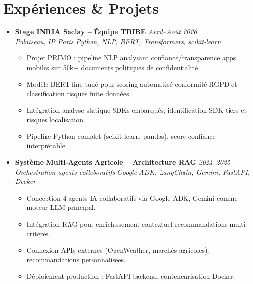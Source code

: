 \documentclass[a4paper,11pt]{article}
\begin{document}
\section{Exp\'eriences \& Projets}
\begin{itemize}[leftmargin=0.5cm, nosep]

    \item \textbf{Stage INRIA Saclay -- \'Equipe TRIBE} \hfill \textit{Avril--Ao\^ut 2026} \\
    \textit{Palaiseau, IP Paris} \hfill \textit{Python, NLP, BERT, Transformers, scikit-learn}
    \vspace{-2pt}
    \begin{itemize}[leftmargin=0.4cm, nosep, label=\tiny$\bullet$]
        \item \small{Projet PRIMO : pipeline NLP analysant confiance/transparence apps mobiles sur 50k+ documents politiques de confidentialit\'e.}
        \item \small{Mod\`ele BERT fine-tun\'e pour scoring automatisé conformit\'e RGPD et classification risques fuite donn\'ees.}
        \item \small{Int\'egration analyse statique SDKs embarqu\'es, identification SDK tiers et risques localisation.}
        \item \small{Pipeline Python complet (scikit-learn, pandas), score confiance interpr\'etable.}
    \end{itemize}
    \vspace{3pt}

    \item \textbf{Syst\`eme Multi-Agents Agricole -- Architecture RAG} \hfill \textit{2024--2025} \\
    \textit{Orchestration agents collaboratifs} \hfill \textit{Google ADK, LangChain, Gemini, FastAPI, Docker}
    \vspace{-2pt}
    \begin{itemize}[leftmargin=0.4cm, nosep, label=\tiny$\bullet$]
        \item \small{Conception 4 agents IA collaboratifs via Google ADK, Gemini comme moteur LLM principal.}
        \item \small{Int\'egration RAG pour enrichissement contextuel recommandations multi-crit\`eres.}
        \item \small{Connexion APIs externes (OpenWeather, march\'es agricoles), recommandations personnalis\'ees.}
        \item \small{D\'eploiement production : FastAPI backend, conteneurisation Docker.}
    \end{itemize}
    \vspace{3pt}


\end{itemize}
\end{document}
